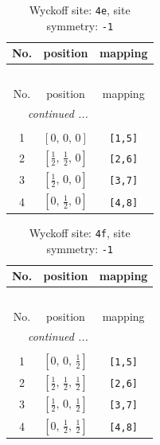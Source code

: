 \documentclass[fleqn,8pt]{jsarticle}
\begin{document}
\begin{longtable}{ccc}
\caption{Wyckoff site: {\tt 4e}, site symmetry: {\tt -1}}
 \\
 \hline \hline
No. & position & mapping \\ \hline \endfirsthead

\multicolumn{2}{l}{\tablename\ \thetable{}} \\
 \hline \hline
No. & position & mapping \\ \hline \endhead

 \hline \hline
\multicolumn{2}{r}{\footnotesize\it continued ...} \\ \endfoot

 \hline \hline
\multicolumn{2}{r}{} \\ \endlastfoot

1 & $\left[ 0,\, 0,\, 0 \right]$ & {\tt [1,5]} \\ \hline
2 & $\left[ \frac{1}{2},\, \frac{1}{2},\, 0 \right]$ & {\tt [2,6]} \\ \hline
3 & $\left[ \frac{1}{2},\, 0,\, 0 \right]$ & {\tt [3,7]} \\ \hline
4 & $\left[ 0,\, \frac{1}{2},\, 0 \right]$ & {\tt [4,8]} \\
\end{longtable}
\renewcommand{\arraystretch}{1.2}
\begin{longtable}{ccc}
\caption{Wyckoff site: {\tt 4f}, site symmetry: {\tt -1}}
 \\
 \hline \hline
No. & position & mapping \\ \hline \endfirsthead

\multicolumn{2}{l}{\tablename\ \thetable{}} \\
 \hline \hline
No. & position & mapping \\ \hline \endhead

 \hline \hline
\multicolumn{2}{r}{\footnotesize\it continued ...} \\ \endfoot

 \hline \hline
\multicolumn{2}{r}{} \\ \endlastfoot

1 & $\left[ 0,\, 0,\, \frac{1}{2} \right]$ & {\tt [1,5]} \\ \hline
2 & $\left[ \frac{1}{2},\, \frac{1}{2},\, \frac{1}{2} \right]$ & {\tt [2,6]} \\ \hline
3 & $\left[ \frac{1}{2},\, 0,\, \frac{1}{2} \right]$ & {\tt [3,7]} \\ \hline
4 & $\left[ 0,\, \frac{1}{2},\, \frac{1}{2} \right]$ & {\tt [4,8]} \\
\end{longtable}
\end{document}
